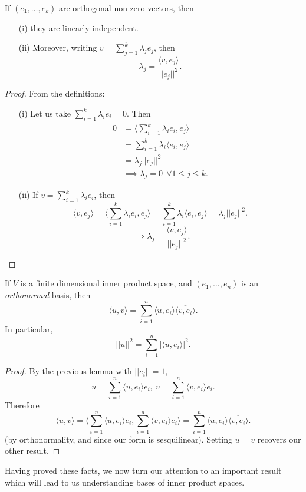 \documentclass[a4paper]{scrartcl}
\begin{document}
\begin{lemma}
      If $\left(e_1, \ldots , e_k\right)$ are orthogonal non-zero vectors, then 
      \begin{itemize}
           \item[(i)] they are linearly independent.
           \item[(ii)] Moreover, writing $v=\sum_{j=1}^{k}\lambda_j e_j$, then 
           \[\lambda_j=\frac{\langle v,e_j \rangle  }{||e_j||^2}.\]
      \end{itemize} 
\end{lemma}
\begin{proof}
     From the definitions:
     \begin{itemize}
          \item[(i)]Let us take $\sum_{i=1}^{k}\lambda_i e_i=0$. Then
          \begin{align*}
               0&= \langle \sum_{i=1}^{k}\lambda_i e_i,e_j \rangle \\&=\sum_{i=1}^{k}\lambda_i \langle e_i,e_j \rangle \\&= \lambda_j ||e_j||^2 \\&\implies \lambda_j=0 \ \ \forall 1 \leq j \leq k.
          \end{align*}
          \item[(ii)] If $v=\sum_{i=1}^{k}\lambda_i e_i$, then 
          \[\langle v,e_j \rangle  =\langle \sum_{i=1}^{k}\lambda_i e_i,e_j \rangle=\sum_{i=1}^{k}\lambda_i \langle e_i,e_j \rangle  =\lambda_j ||e_j||^2 .\]
          \[\implies \lambda_j=\frac{\langle v,e_j \rangle  }{||e_j||^2}.\]
     \end{itemize}
      
\end{proof}

\begin{lemma}
      If $V$ is a finite dimensional inner product space, and $\left(e_1, \ldots ,e_n\right)$ is an \emph{orthonormal} basis, then 
      \[\langle u,v \rangle  =\sum_{i=1}^{n}\langle u,e_i \rangle  \overline{\langle v,e_i \rangle  } .\]
      In particular, 
      \[||u||^2 =\sum_{i=1}^{n}|\langle u,e_i \rangle |^2.\]
\end{lemma}

\begin{proof}
     By the previous lemma with $||e_i||=1$, 
     \[u= \sum_{i=1}^{n}\langle u,e_i \rangle   e_i, \ v= \sum_{i=1}^{n}\langle v,e_i \rangle  e_i.\]
     Therefore 
     \[\langle u,v \rangle  =\langle \sum_{i=1}^{n}\langle u,e_i \rangle   e_i,\sum_{i=1}^{n}\langle v,e_i \rangle  e_i \rangle=\sum_{i=1}^{n}\langle u,e_i \rangle  \overline{\langle v,e_i \rangle  }.\]
     (by orthonormality, and since our form is sesquilinear). Setting $u=v$ recovers our other result.
\end{proof}
Having proved these facts, we now turn our attention to an important result which will lead to us understanding bases of inner product spaces.
\end{document}
